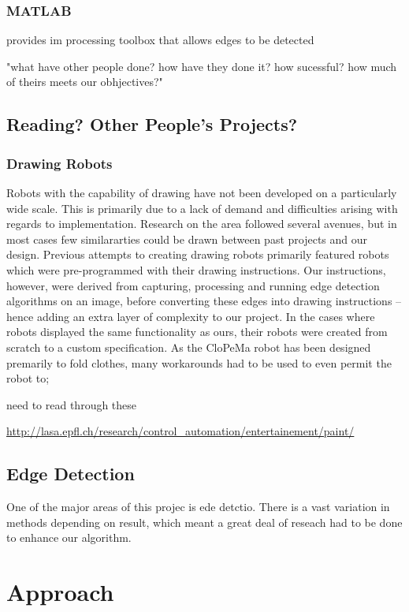 \documentclass{l3proj}
\begin{document}
\subsection{MATLAB}
provides im processing toolbox that allows edges to be detected

"what have other people done? how have they done it? how sucessful? how much of theirs meets our obhjectives?"

\section{Reading? Other People's Projects?}
\subsection{Drawing Robots}
Robots with the capability of drawing have not been developed on a particularly wide scale. This is primarily due to a lack of demand and difficulties arising with regards to implementation. Research on the area followed several avenues, but in most cases few similararties could be drawn between past projects and our design. Previous attempts to creating drawing robots primarily featured robots which were pre-programmed with their drawing instructions. Our instructions, however, were derived from capturing, processing and running edge detection algorithms on an image, before converting these edges into drawing instructions -- hence adding an extra layer of complexity to our project. In the cases where robots displayed the same functionality as ours, their robots were created from scratch to a custom specification. As the CloPeMa robot has been designed premarily to fold clothes, many workarounds had to be used to even permit the robot to;


need to read through these

\url{http://lasa.epfl.ch/research/control_automation/entertainement/paint/}


 
\section{Edge Detection}
One of the major areas of this projec is ede detctio. There is a vast variation in methods depending on result, which meant a great deal of reseach had to be done to enhance our algorithm. 
%

\chapter{Approach}
\end{document}
